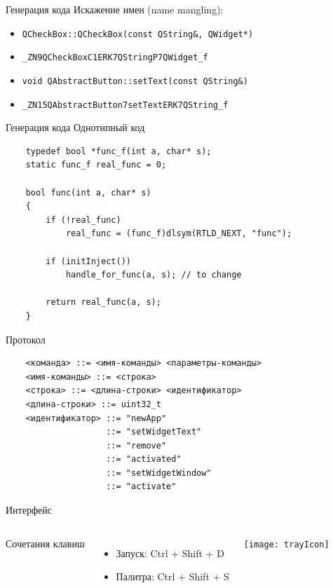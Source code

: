 \documentclass[aspectratio=1610]{beamer}
\begin{document}

\begin{frame}{Генерация кода}
	Искажение имен (name mangling):
	\begin{itemize}		
		\item \texttt{QCheckBox::QCheckBox(const QString\&, QWidget*)}
		\item \texttt{\_ZN9QCheckBoxC1ERK7QStringP7QWidget\_f}
		\item \texttt{void QAbstractButton::setText(const QString\&)}
		\item \texttt{\_ZN15QAbstractButton7setTextERK7QString\_f}
	\end{itemize}
\end{frame}

\begin{frame}[fragile]{Генерация кода}
	Однотипный код
	\begin{verbatim}
    typedef bool *func_f(int a, char* s);
    static func_f real_func = 0;

    bool func(int a, char* s)
    {
        if (!real_func)
            real_func = (func_f)dlsym(RTLD_NEXT, "func");

        if (initInject())
            handle_for_func(a, s); // to change
            
        return real_func(a, s);
    }
	\end{verbatim}
\end{frame}

\begin{frame}[fragile]{Протокол}
	\begin{verbatim}
    <команда> ::= <имя-­команды> <параметры-­команды>
    <имя-­команды> ::= <строка>
    <строка> ::= <длина-­строки> <идентификатор>
    <длина-­строки> ::= uint32_t
    <идентификатор> ::= "newApp"
                    ::= "setWidgetText"
                    ::= "remove"
                    ::= "activated"
                    ::= "setWidgetWindow"
                    ::= "activate"
	\end{verbatim}
\end{frame}

\begin{frame}{Интерфейс}
    \begin{columns}
		Сочетания клавиш
		\begin{itemize}
			\item Запуск: Ctrl + Shift + D
			\item Палитра: Ctrl + Shift + S
		\end{itemize}
		\texttt{[image: trayIcon]}
	\end{columns} 
\end{frame}
\end{document}
